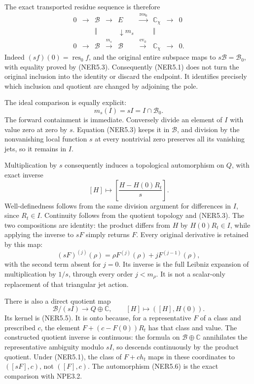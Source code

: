 The exact transported residue sequence is therefore \[
\begin{array}{ccccccccc}
0&\to&\mathcal B&\to&E&\xrightarrow{\operatorname{res}_0}&\mathbb C_\chi&\to&0\\
&&\Vert&&\downarrow m_s&&\Vert\\
0&\to&\mathcal B&\xrightarrow{m_s}&\mathcal B&\xrightarrow{\operatorname{ev}_0}&\mathbb C_\chi&\to&0.
\end{array}
\tag{NER5.4}
\] Indeed \((sf)(0)=\operatorname{res}_0 f\), and the original entire
subspace maps to \(s\mathcal B=\mathcal B_0\), with equality proved by
(NER5.3). Consequently (NER5.1) does not turn the original inclusion
into the identity or discard the endpoint. It identifies precisely which
inclusion and quotient are changed by adjoining the pole.

The ideal comparison is equally explicit: \[
m_s(I)=sI=I\cap\mathcal B_0.
\tag{NER5.5}
\] The forward containment is immediate. Conversely divide an element of
\(I\) with value zero at zero by \(s\). Equation (NER5.3) keeps it in
\(\mathcal B\), and division by the nonvanishing local function \(s\) at
every nontrivial zero preserves all its vanishing jets, so it remains in
\(I\).

Multiplication by \(s\) consequently induces a topological automorphism
on \(Q\), with exact inverse \[
[H]\longmapsto\left[\frac{H-H(0)R_t}{s}\right].
\tag{NER5.6}
\] Well-definedness follows from the same division argument for
differences in \(I\), since \(R_t\in I\). Continuity follows from the
quotient topology and (NER5.3). The two compositions are identity: the
product differs from \(H\) by \(H(0)R_t\in I\), while applying the
inverse to \(sF\) simply returns \(F\). Every original derivative is
retained by this map: \[
(sF)^{(j)}(\rho)=\rho F^{(j)}(\rho)+jF^{(j-1)}(\rho),
\tag{NER5.7}
\] with the second term absent for \(j=0\). Its inverse is the full
Leibniz expansion of multiplication by \(1/s\), through every order
\(j<m_\rho\). It is not a scalar-only replacement of that triangular jet
action.

There is also a direct quotient map \[
\mathcal B/(sI)\longrightarrow Q\oplus\mathbb C,
\qquad[H]\longmapsto([H],H(0)).
\tag{NER5.8}
\] Its kernel is (NER5.5). It is onto because, for a representative
\(F\) of a class and prescribed \(c\), the element \(F+(c-F(0))R_t\) has
that class and value. The constructed quotient inverse is continuous:
the formula on \(\mathcal B\oplus\mathbb C\) annihilates the
representative ambiguity modulo \(sI\), so descends continuously by the
product quotient. Under (NER5.1), the class of \(F+ch_t\) maps in these
coordinates to \(([sF],c)\), not \(([F],c)\). The automorphism (NER5.6)
is the exact comparison with NPE3.2.


